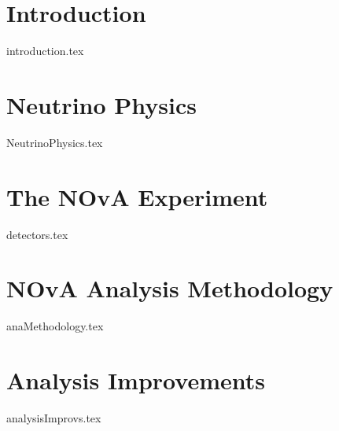 \documentclass[a4paper,11pt]{report}
\newcommand{\linespacing}{1.5}
\renewcommand{\baselinestretch}{\linespacing}
\begin{document}

%
%
%

%
%
%
%
%

\newcommand{\hadefrac}{$E_{had.} / E_\nu$}

\newpage
{}


\chapter{Introduction}
{introduction.tex}

\chapter{Neutrino Physics}
{NeutrinoPhysics.tex}

\chapter{The NOvA Experiment}\label{chp:detectors}
{detectors.tex}

\chapter{NOvA Analysis Methodology}
{anaMethodology.tex}

\chapter{Analysis Improvements}
{analysisImprovs.tex}
\end{document}

